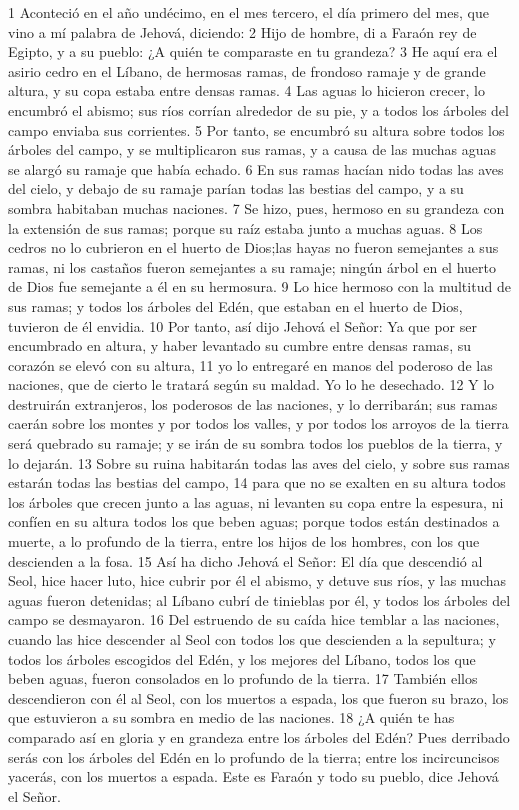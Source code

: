 1 Aconteció en el año undécimo, en el mes tercero, el día primero del mes, que vino a mí palabra de Jehová, diciendo:
2 Hijo de hombre, di a Faraón rey de Egipto, y a su pueblo: ¿A quién te comparaste en tu grandeza?
3 He aquí era el asirio cedro en el Líbano, de hermosas ramas, de frondoso ramaje y de grande altura, y su copa estaba entre densas ramas.
4 Las aguas lo hicieron crecer, lo encumbró el abismo; sus ríos corrían alrededor de su pie, y a todos los árboles del campo enviaba sus corrientes.
5 Por tanto, se encumbró su altura sobre todos los árboles del campo, y se multiplicaron sus ramas, y a causa de las muchas aguas se alargó su ramaje que había echado.
6 En sus ramas hacían nido todas las aves del cielo, y debajo de su ramaje parían todas las bestias del campo, y a su sombra habitaban muchas naciones.
7 Se hizo, pues, hermoso en su grandeza con la extensión de sus ramas; porque su raíz estaba junto a muchas aguas.
8 Los cedros no lo cubrieron en el huerto de Dios;las hayas no fueron semejantes a sus ramas, ni los castaños fueron semejantes a su ramaje; ningún árbol en el huerto de Dios fue semejante a él en su hermosura.
9 Lo hice hermoso con la multitud de sus ramas; y todos los árboles del Edén, que estaban en el huerto de Dios, tuvieron de él envidia.
10 Por tanto, así dijo Jehová el Señor: Ya que por ser encumbrado en altura, y haber levantado su cumbre entre densas ramas, su corazón se elevó con su altura,
11 yo lo entregaré en manos del poderoso de las naciones, que de cierto le tratará según su maldad. Yo lo he desechado.
12 Y lo destruirán extranjeros, los poderosos de las naciones, y lo derribarán; sus ramas caerán sobre los montes y por todos los valles, y por todos los arroyos de la tierra será quebrado su ramaje; y se irán de su sombra todos los pueblos de la tierra, y lo dejarán.
13 Sobre su ruina habitarán todas las aves del cielo, y sobre sus ramas estarán todas las bestias del campo,
14 para que no se exalten en su altura todos los árboles que crecen junto a las aguas, ni levanten su copa entre la espesura, ni confíen en su altura todos los que beben aguas; porque todos están destinados a muerte, a lo profundo de la tierra, entre los hijos de los hombres, con los que descienden a la fosa.
15 Así ha dicho Jehová el Señor: El día que descendió al Seol, hice hacer luto, hice cubrir por él el abismo, y detuve sus ríos, y las muchas aguas fueron detenidas; al Líbano cubrí de tinieblas por él, y todos los árboles del campo se desmayaron.
16 Del estruendo de su caída hice temblar a las naciones, cuando las hice descender al Seol con todos los que descienden a la sepultura; y todos los árboles escogidos del Edén, y los mejores del Líbano, todos los que beben aguas, fueron consolados en lo profundo de la tierra.
17 También ellos descendieron con él al Seol, con los muertos a espada, los que fueron su brazo, los que estuvieron a su sombra en medio de las naciones. 
18 ¿A quién te has comparado así en gloria y en grandeza entre los árboles del Edén? Pues derribado serás con los árboles del Edén en lo profundo de la tierra; entre los incircuncisos yacerás, con los muertos a espada. Este es Faraón y todo su pueblo, dice Jehová el Señor.

